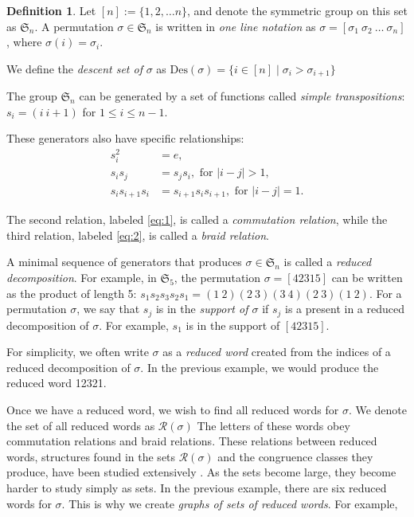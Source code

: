 \documentclass[11pt,reqno]{amsart}
\theoremstyle{definition}
\newtheorem{definition}[theorem]{Definition}
\theoremstyle{notation}
\newcommand{\Des}{\text{Des}}
\newcommand{\calR}{\mathcal{R}}
\newcommand{\Sym}{\mathfrak{S}}
\newcommand{\JEem}{\textit}
\begin{document}
\begin{definition}\label{def:sym_group}
    Let $[n] := \{1,2, \ldots n \}$, and denote the symmetric group on this set as $\mathfrak{S}_n$. A permutation $\sigma\in \Sym_n$ is written in \JEem{one line notation} as $\sigma = [\sigma_1 ~\sigma_2 ~ \ldots ~\sigma_n]$, where $\sigma(i) = \sigma_i$.

    We define the \JEem{descent set of} $\sigma$ as $\Des(\sigma ) = \{ i\in [n] \mid \sigma_i>\sigma_{i+1}\}$
    
    The group $\Sym_n$ can be generated by a set of functions called \textit{simple transpositions}: $s_i = (i~i+1)$ for $1\leq i\leq n-1$. 
  
These generators also have specific relationships:
\begin{align}
s_i^2 &= e, \\
s_i s_j &= s_j s_i, \label{eq:1} \mbox{ for } |i-j|>1 ,\\
s_i s_{i+1} s_i &= s_{i+1} s_i s_{i+1}, \label{eq:2} \mbox{ for } |i-j|=1.
\end{align}
\end{definition}

The second relation, labeled \eqref{eq:1}, is called a \JEem{commutation relation}, while the third relation, labeled \eqref{eq:2}, is called a \JEem{braid relation}. %

A minimal sequence of generators that produces $\sigma \in \mathfrak{S}_n$ is called a \JEem{reduced decomposition}. 
For example, in $\mathfrak{S}_5$, the permutation $\sigma =[42315]$ can be written as the product of length 5: $s_1s_2s_3s_2s_1= (1~2)(2~3)(3~4)(2~3)(1~2)$. For a permutation $\sigma$, we say that $s_j$ is in the \JEem{support of $\sigma$} if $s_j$ is a present in a reduced decomposition of $\sigma$. For example, $s_1$ is in the support of $[42315]$.

For simplicity, we often write $\sigma$ as a \textit{reduced word} created from the indices of a reduced decomposition of $\sigma$. In the previous example, we would produce the reduced word 12321. 

Once we have a reduced word, we wish to find all reduced words for $\sigma$. We denote the set of all reduced words as $\calR(\sigma)$
The letters of these words obey commutation relations and braid relations. These relations between reduced words, structures found in the sets $\calR (\sigma)$ and the congruence classes they produce, have been studied extensively \cite{RR, S1, T2}. As the sets become large, they become harder to study simply as sets. In the previous example, there are six reduced words for $\sigma$. This is why we create \JEem{graphs of sets of reduced words}. For example,
\end{document}
